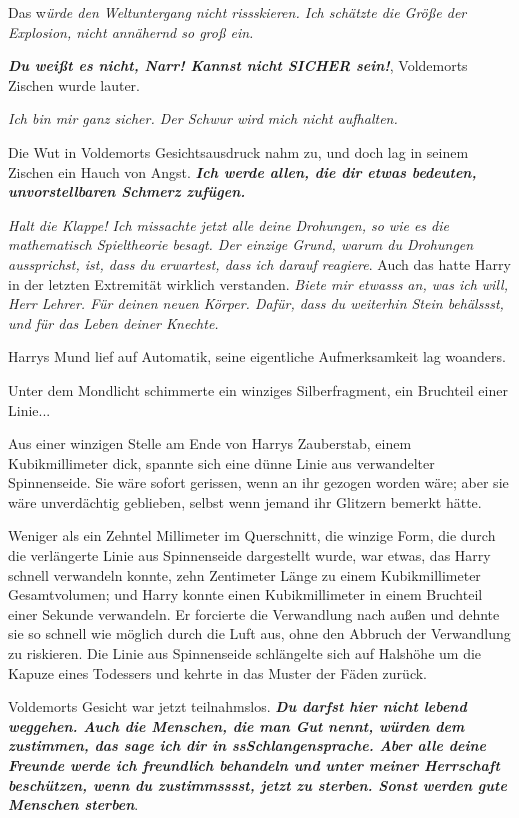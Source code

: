 \glqq Das w\emph{ürde den Weltuntergang nicht rissskieren. Ich schätzte die
Größe der Explosion, nicht annähernd so groß ein.}\grqq{}

\glqq \textbf{\emph{Du weißt es nicht, Narr! Kannst nicht SICHER sein!}}\grqq{},
Voldemorts Zischen wurde lauter.

\glqq \emph{Ich bin mir ganz sicher. Der Schwur wird mich nicht
aufhalten.}\grqq{}

Die Wut in Voldemorts Gesichtsausdruck nahm zu, und doch lag in seinem Zischen
ein Hauch von Angst. \glqq \textbf{\emph{Ich werde allen, die dir etwas
bedeuten, unvorstellbaren Schmerz zufügen.}}\grqq{}

\glqq \emph{Halt die Klappe! Ich missachte jetzt alle deine Drohungen, so wie es
die mathematisch Spieltheorie besagt. Der einzige Grund, warum du Drohungen
aussprichst, ist, dass du erwartest, dass ich darauf reagiere}.\grqq{} Auch das
hatte Harry in der letzten Extremität wirklich verstanden. \glqq \emph{Biete mir
etwasss an, was ich will, Herr Lehrer. Für deinen neuen Körper. Dafür, dass du
weiterhin Stein behälssst, und für das Leben deiner Knechte.}\grqq{}

Harrys Mund lief auf Automatik, seine eigentliche Aufmerksamkeit lag woanders.

Unter dem Mondlicht schimmerte ein winziges Silberfragment, ein Bruchteil einer
Linie...

Aus einer winzigen Stelle am Ende von Harrys Zauberstab, einem Kubikmillimeter
dick, spannte sich eine dünne Linie aus verwandelter Spinnenseide. Sie wäre
sofort gerissen, wenn an ihr gezogen worden wäre; aber sie wäre unverdächtig
geblieben, selbst wenn jemand ihr Glitzern bemerkt hätte.

Weniger als ein Zehntel Millimeter im Querschnitt, die winzige Form, die durch
die verlängerte Linie aus Spinnenseide dargestellt wurde, war etwas, das Harry
schnell verwandeln konnte, zehn Zentimeter Länge zu einem Kubikmillimeter
Gesamtvolumen; und Harry konnte einen Kubikmillimeter in einem Bruchteil einer
Sekunde verwandeln. Er forcierte die Verwandlung nach außen und dehnte sie so
schnell wie möglich durch die Luft aus, ohne den Abbruch der Verwandlung zu
riskieren. Die Linie aus Spinnenseide schlängelte sich auf Halshöhe um die
Kapuze eines Todessers und kehrte in das Muster der Fäden zurück.

Voldemorts Gesicht war jetzt teilnahmslos. \glqq \textbf{\emph{Du darfst hier
nicht lebend weggehen. Auch die Menschen, die man Gut nennt, würden dem
zustimmen, das sage ich dir in ssSchlangensprache. Aber alle deine Freunde werde
ich freundlich behandeln und unter meiner Herrschaft beschützen, wenn du
zustimmsssst, jetzt zu sterben. Sonst werden gute Menschen sterben}}.\grqq{}

